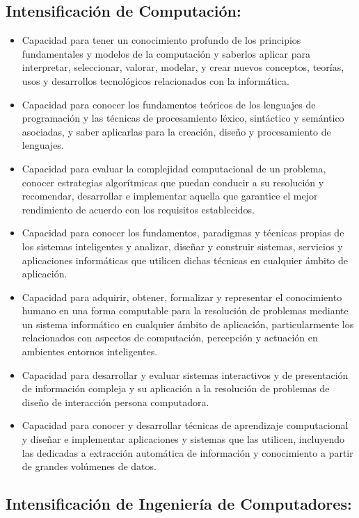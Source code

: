 \documentclass{pre-tfg}
\begin{document}
\subsection*{Intensificación de Computación:}

\begin{itemize}
\item Capacidad para tener un conocimiento profundo de los principios fundamentales y
  modelos de la computación y saberlos aplicar para interpretar, seleccionar, valorar,
  modelar, y crear nuevos conceptos, teorías, usos y desarrollos tecnológicos relacionados
  con la informática.
\item Capacidad para conocer los fundamentos teóricos de los lenguajes de programación y
  las técnicas de procesamiento léxico, sintáctico y semántico asociadas, y saber
  aplicarlas para la creación, diseño y procesamiento de lenguajes.
\item Capacidad para evaluar la complejidad computacional de un problema, conocer
  estrategias algorítmicas que puedan conducir a su resolución y recomendar, desarrollar e
  implementar aquella que garantice el mejor rendimiento de acuerdo con los requisitos
  establecidos.
\item Capacidad para conocer los fundamentos, paradigmas y técnicas propias de los
  sistemas inteligentes y analizar, diseñar y construir sistemas, servicios y aplicaciones
  informáticas que utilicen dichas técnicas en cualquier ámbito de aplicación.
\item Capacidad para adquirir, obtener, formalizar y representar el conocimiento humano en
  una forma computable para la resolución de problemas mediante un sistema informático en
  cualquier ámbito de aplicación, particularmente los relacionados con aspectos de
  computación, percepción y actuación en ambientes entornos inteligentes.
\item Capacidad para desarrollar y evaluar sistemas interactivos y de presentación de
  información compleja y su aplicación a la resolución de problemas de diseño de
  interacción persona computadora.
\item Capacidad para conocer y desarrollar técnicas de aprendizaje computacional y diseñar
  e implementar aplicaciones y sistemas que las utilicen, incluyendo las dedicadas a
  extracción automática de información y conocimiento a partir de grandes volúmenes de
  datos.
\end{itemize}


\subsection*{Intensificación de Ingeniería de Computadores:}
\end{document}
